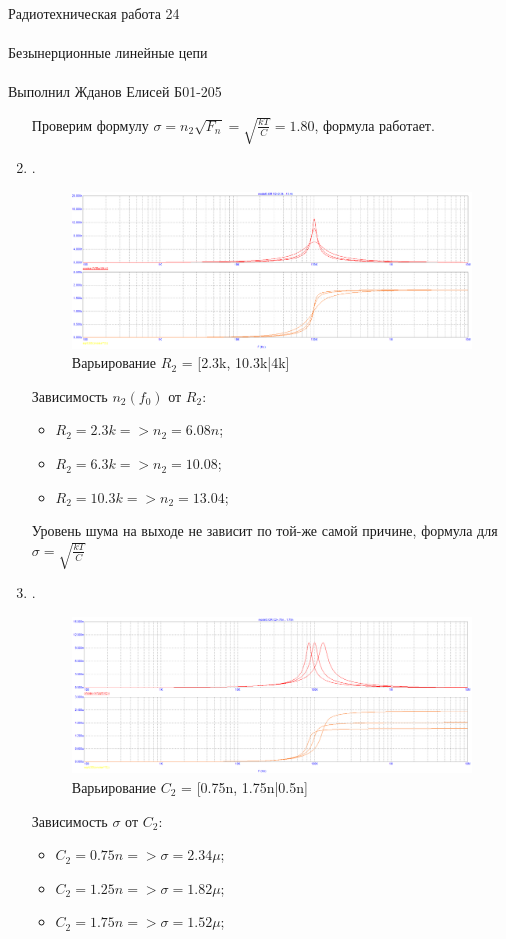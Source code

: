 \documentclass{astroedu-lab}
\begin{document}
\begin{problem}{\huge Радиотехническая работа 24\\\\Безынерционные линейные цепи\\\\Выполнил Жданов Елисей Б01-205}
\begin{enumerate}
Проверим формулу $\sigma = n_2\sqrt{F_n} = \sqrt{\frac{kT}{C}} = 1.80$, формула работает.

\item

.

\begin{figure}[h!]
    \centering
    \includegraphics[scale=0.3]{images/mod3_2_3.png}
    \caption{Варьирование $R_2$ = [2.3k, 10.3k|4k]}
    \label{fig:m323}
\end{figure}

Зависимость $n_2(f_0)$ от $R_2$:
\begin{itemize}
    \item $R_2 = 2.3k => n_2 = 6.08n$;
    \item $R_2 = 6.3k => n_2 = 10.08$;
    \item $R_2 = 10.3k => n_2 = 13.04$;
\end{itemize}

Уровень шума на выходе не зависит по той-же самой причине, формула для $\sigma = \sqrt{\frac{kT}{C}}$

\item

.

\begin{figure}[h!]
    \centering
    \includegraphics[scale=0.3]{images/mod3_2_4.png}
    \caption{Варьирование $C_2$ = [0.75n, 1.75n|0.5n]}
    \label{fig:m324}
\end{figure}

Зависимость $\sigma$ от $C_2$:
\begin{itemize}
    \item $C_2 = 0.75n => \sigma = 2.34\mu$;
    \item $C_2 = 1.25n => \sigma = 1.82\mu$;
    \item $C_2 = 1.75n => \sigma = 1.52\mu$;
\end{itemize}


\end{enumerate}
\end{problem}
\end{document}
